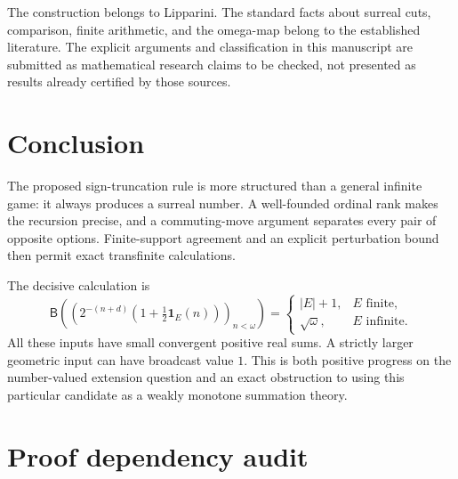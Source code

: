 \documentclass[11pt,letterpaper]{article}
\theoremstyle{definition}
\theoremstyle{remark}
\newcommand{\BB}{\mathsf B}
\begin{document}
The construction belongs to Lipparini. The standard facts about surreal cuts,
comparison, finite arithmetic, and the omega-map belong to the established
literature. The explicit arguments and classification in this manuscript are
submitted as mathematical research claims to be checked, not presented as
results already certified by those sources.

\section{Conclusion}

The proposed sign-truncation rule is more structured than a general infinite
game: it always produces a surreal number. A well-founded ordinal rank makes
the recursion precise, and a commuting-move argument separates every pair of
opposite options. Finite-support agreement and an explicit perturbation bound
then permit exact transfinite calculations.

The decisive calculation is
\[
 \BB\left(\left(2^{-(n+d)}
       \left(1+\tfrac12\mathbf 1_E(n)\right)\right)_{n<\omega}\right)
  =\begin{cases}|E|+1,&E\text{ finite},\\\sqrt{\omega},&E\text{ infinite}.
    \end{cases}
\]
All these inputs have small convergent positive real sums. A strictly larger
geometric input can have broadcast value $1$. This is both positive progress
on the number-valued extension question and an exact obstruction to using this
particular candidate as a weakly monotone summation theory.

\appendix
\section{Proof dependency audit}\label{app:dependencies}
\end{document}
